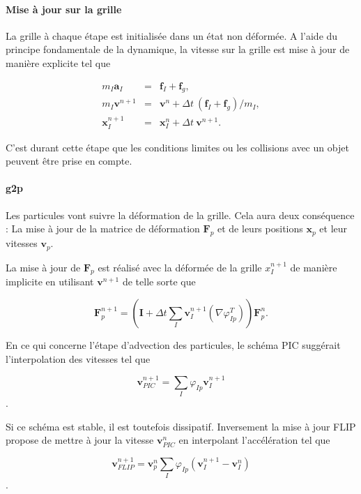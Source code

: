 \paragraph*{Mise à jour sur la grille}
La grille à chaque étape est initialisée dans un état non déformée. A l'aide du principe fondamentale de la dynamique, la vitesse sur la grille est mise à jour de manière explicite tel que

\begin{eqnarray*}
    m_I \bm a_I &=& \bm f_I + \bm f_g, \\
    m_I \bm v^{n+1} &=& \bm v^{n} + \Delta t~ (\bm f_I + \bm f_g) / m_I, \\
    \bm x_I^{n+1} &=& \bm x_I^{n} + \Delta t~ \bm v^{n+1}.
\end{eqnarray*}

C'est durant cette étape que les conditions limites ou les collisions avec un objet peuvent être prise en compte.

\paragraph{g2p}

Les particules vont suivre la déformation de la grille. Cela aura deux conséquence : La mise à jour de la matrice de déformation $\bm F_p$ et de leurs positions $\bm x_p$ et leur vitesses $\bm v_p$.

La mise à jour de $\bm F_p$ est réalisé avec la déformée de la grille $ x_I^{n+1}$ de manière implicite en utilisant $\bm v^{n+1}$ de telle sorte que

\begin{equation*}
    \bm F_p^{n+1} = \left( \bm I + \Delta t \sum_I \bm v_I^{n+1} (\nabla \varphi_{Ip}^T)\right) \bm  F_p^{n}.
\end{equation*}

En ce qui concerne l'étape d'advection des particules, le schéma PIC suggérait l'interpolation des vitesses tel que

\begin{equation*}
    \bm v_{PIC}^{n+1} = \sum_I \varphi_{Ip} \bm v_I^{n+1}
\end{equation*}.

Si ce schéma est stable, il est toutefois dissipatif. Inversement la mise à jour FLIP propose de mettre à jour la vitesse $\bm v_{PIC}^{n}$ en interpolant l'accélération tel que

\begin{equation*}
    \bm v_{FLIP}^{n+1} = \bm v_{p}^{n} \sum_I \varphi_{Ip} (\bm v_I^{n+1} - \bm v_I^{n})
\end{equation*}.

